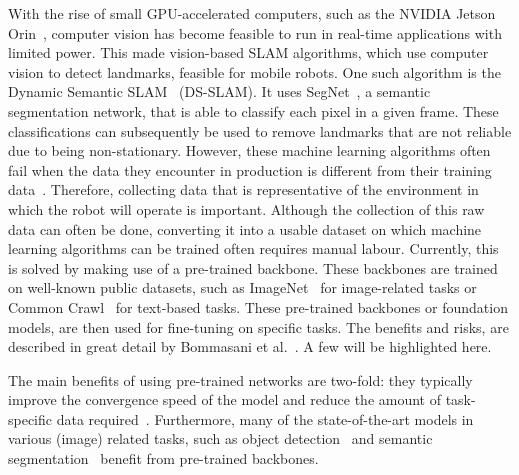 With the rise of small GPU-accelerated computers, such as the NVIDIA Jetson Orin~\cite{NVIDIA_Karumbunathan_2022}, computer vision has become feasible to run in real-time applications with limited power. This made vision-based SLAM algorithms, which use computer vision to detect landmarks, feasible for mobile robots. One such algorithm is the Dynamic Semantic SLAM~\cite{yu2018ds} (DS-SLAM). It uses SegNet~\cite{badri2017segnet}, a semantic segmentation network, that is able to classify each pixel in a given frame. These classifications can subsequently be used to remove landmarks that are not reliable due to being non-stationary. However, these machine learning algorithms often fail when the data they encounter in production is different from their training data~\cite{Goodfellow-et-al-2016,ozdag2018adversarial,warde201611,10.14778/3632093.3632098,DBLP:journals/corr/KurakinGB16a,10.1145/3422622}. Therefore, collecting data that is representative of the environment in which the robot will operate is important. Although the collection of this raw data can often be done, converting it into a usable dataset on which machine learning algorithms can be trained often requires manual labour. Currently, this is solved by making use of a pre-trained backbone. These backbones are trained on well-known public datasets, such as ImageNet~\cite{deng2009imagenet} for image-related tasks or Common Crawl~\cite{commoncrawl} for text-based tasks. These pre-trained backbones or foundation models, are then used for fine-tuning on specific tasks. The benefits and risks, are described in great detail by Bommasani et al.~\cite{DBLP:journals/corr/abs-2108-07258}. A few will be highlighted here.

The main benefits of using pre-trained networks are two-fold: they typically improve the convergence speed of the model and reduce the amount of task-specific data required~\cite{donahue2014decaf,zeiler2014visualizing}. Furthermore, many of the state-of-the-art models in various (image) related tasks, such as object detection~\cite{liu2016ssd,redmon2016you} and semantic segmentation~\cite{orsic2019defense,girshick2014rich} benefit from pre-trained backbones.

